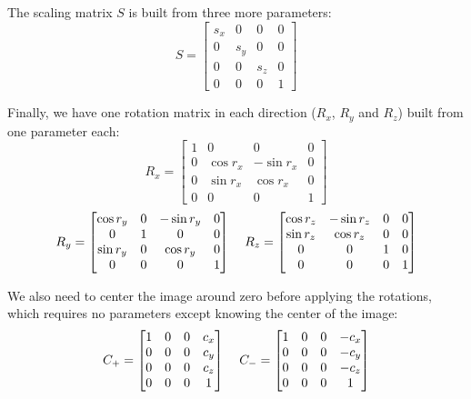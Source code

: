 The scaling matrix $S$ is built from three more parameters:
\begin{equation*}
    S = 
    \begin{bmatrix}
        s_x & 0 & 0 & 0 \\
        0 & s_y & 0 & 0 \\
        0 & 0 & s_z & 0 \\ 
        0 & 0 & 0 & 1
    \end{bmatrix}
\end{equation*}

Finally, we have one rotation matrix in each direction ($R_x$, $R_y$ and $R_z$) built from one parameter each:
\begin{equation*}
    R_x = 
    \begin{bmatrix}
        1 & 0 & 0 & 0 \\
        0 & \cos{r_x} & -\sin{r_x} & 0 \\
        0 & \sin{r_x} & \cos{r_x} & 0 \\ 
        0 & 0 & 0 & 1
    \end{bmatrix}
\end{equation*}
\begin{equation*}
    R_y = 
    \begin{bmatrix}
        \cos{r_y} & 0 & - \sin{r_y} & 0 \\
        0 & 1 & 0 & 0 \\
        \sin{r_y} & 0 & \cos{r_y} & 0 \\ 
        0 & 0 & 0 & 1
    \end{bmatrix}
    \mkern20mu
    R_z = 
    \begin{bmatrix}
        \cos{r_z} & -\sin{r_z} & 0 & 0 \\
        \sin{r_z} & \cos{r_z} & 0 & 0 \\
        0 & 0 & 1 & 0 \\ 
        0 & 0 & 0 & 1
    \end{bmatrix}
\end{equation*}

We also need to center the image around zero before applying the rotations, which requires no parameters except knowing the center of the image:
\begin{equation*}
    C_+ = 
    \begin{bmatrix}
        1 & 0 & 0 & c_x \\
        0 & 0 & 0 & c_y \\
        0 & 0 & 0 & c_z \\ 
        0 & 0 & 0 & 1
    \end{bmatrix}
    \mkern20mu
    C_- = 
    \begin{bmatrix}
        1 & 0 & 0 & -c_x \\
        0 & 0 & 0 & -c_y \\
        0 & 0 & 0 & -c_z \\ 
        0 & 0 & 0 & 1
    \end{bmatrix}
\end{equation*}

